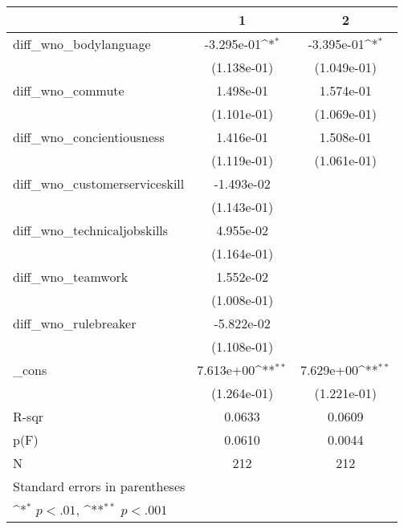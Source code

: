 {
\def\sym#1{\ifmmode^{#1}\else\(^{#1}\)\fi}
\begin{tabular}{l*{2}{c}}
    \toprule
                                    & \multicolumn{1}{c}{1} & \multicolumn{1}{c}{2} \\
    \midrule
    diff\_wno\_bodylanguage         & -3.295e-01\sym{*}     & -3.395e-01\sym{*}     \\
                                    & (1.138e-01)           & (1.049e-01)           \\
    \addlinespace
    diff\_wno\_commute              & 1.498e-01             & 1.574e-01             \\
                                    & (1.101e-01)           & (1.069e-01)           \\
    \addlinespace
    diff\_wno\_concientiousness     & 1.416e-01             & 1.508e-01             \\
                                    & (1.119e-01)           & (1.061e-01)           \\
    \addlinespace
    diff\_wno\_customerserviceskill & -1.493e-02            &                       \\
                                    & (1.143e-01)           &                       \\
    \addlinespace
    diff\_wno\_technicaljobskills   & 4.955e-02             &                       \\
                                    & (1.164e-01)           &                       \\
    \addlinespace
    diff\_wno\_teamwork             & 1.552e-02             &                       \\
                                    & (1.008e-01)           &                       \\
    \addlinespace
    diff\_wno\_rulebreaker          & -5.822e-02            &                       \\
                                    & (1.108e-01)           &                       \\
    \addlinespace
    \_cons                          & 7.613e+00\sym{**}     & 7.629e+00\sym{**}     \\
                                    & (1.264e-01)           & (1.221e-01)           \\
    \midrule
    R-sqr                           & 0.0633                & 0.0609                \\
    p(F)                            & 0.0610                & 0.0044                \\
    N                               & 212                   & 212                   \\
    \bottomrule
    \multicolumn{3}{l}{\footnotesize Standard errors in parentheses}                \\
    \multicolumn{3}{l}{\footnotesize \sym{*} \(p<.01\), \sym{**} \(p<.001\)}        \\
\end{tabular}
}
